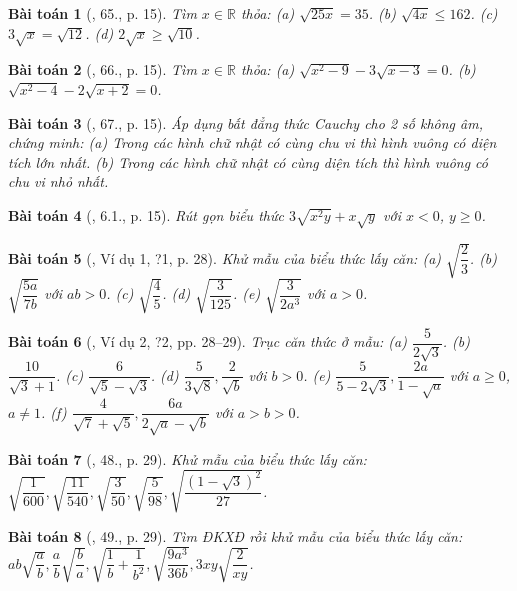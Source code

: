 \documentclass{article}
\newtheorem{baitoan}{Bài toán}
\begin{document}
\begin{baitoan}[\cite{SBT_Toan_9_tap_1}, 65., p. 15]
	Tìm $x\in\mathbb{R}$ thỏa: (a) $\sqrt{25x} = 35$. (b) $\sqrt{4x}\le162$. (c) $3\sqrt{x} = \sqrt{12}$. (d) $2\sqrt{x}\ge\sqrt{10}$.
\end{baitoan}

\begin{baitoan}[\cite{SBT_Toan_9_tap_1}, 66., p. 15]
	Tìm $x\in\mathbb{R}$ thỏa: (a) $\sqrt{x^2 - 9} - 3\sqrt{x - 3} = 0$. (b) $\sqrt{x^2 - 4} - 2\sqrt{x + 2} = 0$.
\end{baitoan}

\begin{baitoan}[\cite{SBT_Toan_9_tap_1}, 67., p. 15]
	Áp dụng bất đẳng thức Cauchy cho 2 số không âm, chứng minh: (a) Trong các hình chữ nhật có cùng chu vi thì hình vuông có diện tích lớn nhất. (b) Trong các hình chữ nhật có cùng diện tích thì hình vuông có chu vi nhỏ nhất.
\end{baitoan}

\begin{baitoan}[\cite{SBT_Toan_9_tap_1}, 6.1., p. 15]
	Rút gọn biểu thức $3\sqrt{x^2y} + x\sqrt{y}$ với $x < 0$, $y\ge0$.
\end{baitoan}

\begin{baitoan}[\cite{SGK_Toan_9_tap_1}, Ví dụ 1, ?1, p. 28]
	Khử mẫu của biểu thức lấy căn: (a) $\sqrt{\dfrac{2}{3}}$. (b) $\sqrt{\dfrac{5a}{7b}}$ với $ab > 0$. (c) $\sqrt{\dfrac{4}{5}}$. (d) $\sqrt{\dfrac{3}{125}}$. (e) $\sqrt{\dfrac{3}{2a^3}}$ với $a > 0$.
\end{baitoan}

\begin{baitoan}[\cite{SGK_Toan_9_tap_1}, Ví dụ 2, ?2, pp. 28--29]
	Trục căn thức ở mẫu: (a) $\dfrac{5}{2\sqrt{3}}$. (b) $\dfrac{10}{\sqrt{3} + 1}$. (c) $\dfrac{6}{\sqrt{5} - \sqrt{3}}$. (d) $\dfrac{5}{3\sqrt{8}},\dfrac{2}{\sqrt{b}}$ với $b > 0$. (e) $\dfrac{5}{5 - 2\sqrt{3}},\dfrac{2a}{1 - \sqrt{a}}$ với $a\ge0$, $a\ne1$. (f) $\dfrac{4}{\sqrt{7} + \sqrt{5}},\dfrac{6a}{2\sqrt{a} - \sqrt{b}}$ với $a > b > 0$.
\end{baitoan}

\begin{baitoan}[\cite{SGK_Toan_9_tap_1}, 48., p. 29]
	Khử mẫu của biểu thức lấy căn: $\sqrt{\dfrac{1}{600}},\sqrt{\dfrac{11}{540}},\sqrt{\dfrac{3}{50}},\sqrt{\dfrac{5}{98}},\sqrt{\dfrac{(1 - \sqrt{3})^2}{27}}$.
\end{baitoan}

\begin{baitoan}[\cite{SGK_Toan_9_tap_1}, 49., p. 29]
	Tìm ĐKXĐ rồi khử mẫu của biểu thức lấy căn: $ab\sqrt{\dfrac{a}{b}},\dfrac{a}{b}\sqrt{\dfrac{b}{a}},\sqrt{\dfrac{1}{b} + \dfrac{1}{b^2}},\sqrt{\dfrac{9a^3}{36b}},3xy\sqrt{\dfrac{2}{xy}}$.
\end{baitoan}
\end{document}
